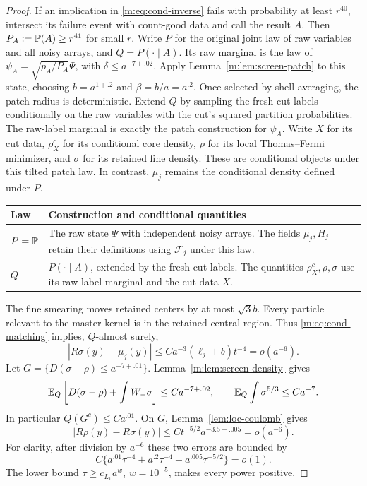 \begin{proof}
If an implication in \eqref{m:eq:cond-inverse} fails with probability
at least $r^{40}$, intersect its failure event with count-good data
and call the result $A$. Then $P_A:=\mathbb P(A)\ge r^{41}$ for small $r$.
Write $P$ for the original joint law of raw variables and all noisy
arrays, and $Q=P(\cdot\mid A)$. Its raw marginal is the law of
$\psi_A=\sqrt{p_A/P_A}\Psi$, with
$\delta\le a^{-7+.02}$.
Apply Lemma~\ref{m:lem:screen-patch} to this state, choosing
$b=a^{1+.2}$ and $\beta=b/a=a^{.2}$.
Once selected by shell averaging, the patch radius is deterministic.
Extend $Q$ by sampling the fresh cut labels conditionally on the raw
variables with the cut's squared partition probabilities.
The raw-label marginal is exactly the patch construction for
$\psi_A$. Write $X$ for its cut data, $\rho_X^c$ for its conditional
core density, $\rho$ for its local Thomas--Fermi minimizer, and
$\sigma$ for its retained fine density. These are conditional objects
under this tilted patch law. In contrast, $\mu_j$ remains the
conditional density defined under $P$.

\begin{center}
\small
\begin{tabular}{@{}p{.12\linewidth}p{.82\linewidth}@{}}
\toprule
Law & Construction and conditional quantities\\
\midrule
$P=\mathbb P$ & The raw state $\Psi$ with independent noisy arrays.
The fields $\mu_j,H_j$ retain their definitions using $\mathcal F_j$
under this law.\\[.6ex]
$Q$ & $P(\cdot\mid A)$, extended by the fresh cut labels.
The quantities $\rho_X^c,\rho,\sigma$ use its raw-label marginal
and the cut data $X$.\\
\bottomrule
\end{tabular}
\end{center}

The fine smearing moves retained centers by at most $\sqrt3b$.
Every particle relevant to the master kernel is in the retained
central region. Thus \eqref{m:eq:cond-matching} implies, $Q$-almost surely,
\begin{equation}\label{m:eq:cond-fine-matching}
 |R\sigma(y)-\mu_j(y)|\le Ca^{-3}(\ell_j+b)t^{-4}=o(a^{-6}).
\end{equation}
Let $G=\{D(\sigma-\rho)\le a^{-7+.01}\}$.
Lemma~\ref{m:lem:screen-density} gives
\begin{equation}\label{m:eq:cond-patch-budget}
 \mathbb E_Q\left[D(\sigma-\rho)+\int W_-\sigma\right]
       \le Ca^{-7+.02},\qquad
 \mathbb E_Q\int\sigma^{5/3}\le Ca^{-7}.
\end{equation}
In particular $Q(G^c)\le Ca^{.01}$. On $G$,
Lemma~\ref{lem:loc-coulomb} gives
\[
 |R\rho(y)-R\sigma(y)|\le Ct^{-5/2}a^{-3.5+.005}=o(a^{-6}).
\]
For clarity, after division by $a^{-6}$ these two errors are bounded
by
\begin{equation}\label{m:eq:cond-density-errors}
 C\{a^{.01}\tau^{-4}+a^{.2}\tau^{-4}
                         +a^{.005}\tau^{-5/2}\}=o(1).
\end{equation}
The lower bound $\tau\ge c_{L_1}a^w$, $w=10^{-5}$, makes every power
positive.


\end{proof}
